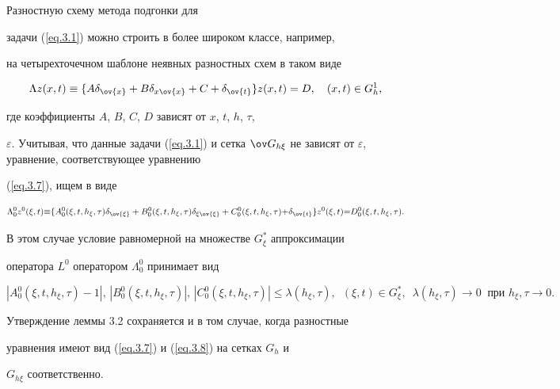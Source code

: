 \begin{notenonum}


Разностную схему метода подгонки для


задачи (\ref{eq.3.1}) можно строить в более широком классе, например,


на четырехточечном шаблоне неявных разностных схем в таком виде


\begin{equation}


\label{eq.3.7}


\Lambda z(x,t)\equiv \{A \delta_{\ov{x}}+B\delta_{x\ov{x}}+C+


\delta_{\ov{t}}\} z(x, t)=D, \quad (x,t)\in G^1_h,


\end{equation}


где коэффициенты $A$, $B$, $C$, $D$ зависят от $x$, $t$, $h$, $\tau$,


$\varepsilon$. Учитывая, что данные задачи (\ref{eq.3.1}) и сетка $\ov G_{h


\xi}$ не зависят от $\varepsilon$, уравнение, соответствующее уравнению


(\ref{eq.3.7}), ищем в виде


\begin{equation}


\label{eq.3.8}


\Lambda^0_0z^0(\xi,t){\equiv}\{A^0_0(\xi,t,h_\xi,\tau)\delta_{\ov{\xi}}+


B^0_0(\xi, t, h_\xi, \tau) \delta_{\xi\ov{\xi}}+


C^0_0(\xi,t,h_\xi,\tau){+}


\delta_{\ov{t}}\} z^0(\xi, t){=}D^0_0(\xi, t, h_\xi,\tau).


\end{equation}


В этом случае условие равномерной на множестве $G^*_\xi$ аппроксимации


оператора $L^0$ оператором $\Lambda^0_0$ принимает вид


$$


|A^0_0(\xi, t, h_\xi, \tau){-}1|, \,


|B^0_0(\xi, t, h_\xi, \tau)|, \,


|C^0_0(\xi, t, h_\xi, \tau)|{\le}


\lambda(h_\xi, \tau), \ \; (\xi, t){\in} G^*_\xi, \ \; \lambda(h_\xi,


\tau){\to} 0 \ \text{ при } h_\xi, \tau{\to} 0.


$$


Утверждение леммы 3.2 сохраняется и в том случае, когда разностные


уравнения имеют вид (\ref{eq.3.7}) и (\ref{eq.3.8}) на сетках $G_h$ и


$G_{h \xi}$ соответственно.


\end{notenonum}





